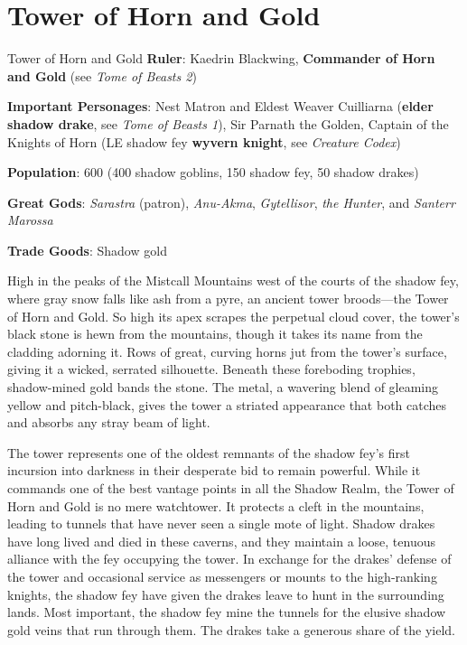\documentclass[10pt,a4paper,twoside,bg=print,twocolumn,openany,nodeprecatedcode]{dndbook}
\begin{document}
\section{Tower of Horn and Gold}
\begin{DndSidebar}[float=!b]{Tower of Horn and Gold}
\textbf{Ruler}: Kaedrin Blackwing, \textbf{Commander of Horn and Gold} (see \textit{Tome of Beasts 2})



\textbf{Important Personages}: Nest Matron and Eldest Weaver Cuilliarna (\textbf{elder shadow drake}, see \textit{Tome of Beasts 1}), Sir Parnath the Golden, Captain of the Knights of Horn (LE shadow fey \textbf{wyvern knight}, see \textit{Creature Codex})



\textbf{Population}: 600 (400 shadow goblins, 150 shadow fey, 50 shadow drakes)



\textbf{Great Gods}: \textit{Sarastra} (patron), \textit{Anu-Akma}, \textit{Gytellisor}, \textit{the Hunter}, and \textit{Santerr Marossa}



\textbf{Trade Goods}: Shadow gold





\end{DndSidebar}

High in the peaks of the Mistcall Mountains west of the courts of the shadow fey, where gray snow falls like ash from a pyre, an ancient tower broods—the Tower of Horn and Gold. So high its apex scrapes the perpetual cloud cover, the tower's black stone is hewn from the mountains, though it takes its name from the cladding adorning it. Rows of great, curving horns jut from the tower's surface, giving it a wicked, serrated silhouette. Beneath these foreboding trophies, shadow-mined gold bands the stone. The metal, a wavering blend of gleaming yellow and pitch-black, gives the tower a striated appearance that both catches and absorbs any stray beam of light.

The tower represents one of the oldest remnants of the shadow fey's first incursion into darkness in their desperate bid to remain powerful. While it commands one of the best vantage points in all the Shadow Realm, the Tower of Horn and Gold is no mere watchtower. It protects a cleft in the mountains, leading to tunnels that have never seen a single mote of light. Shadow drakes have long lived and died in these caverns, and they maintain a loose, tenuous alliance with the fey occupying the tower. In exchange for the drakes' defense of the tower and occasional service as messengers or mounts to the high-ranking knights, the shadow fey have given the drakes leave to hunt in the surrounding lands. Most important, the shadow fey mine the tunnels for the elusive shadow gold veins that run through them. The drakes take a generous share of the yield.
\end{document}
